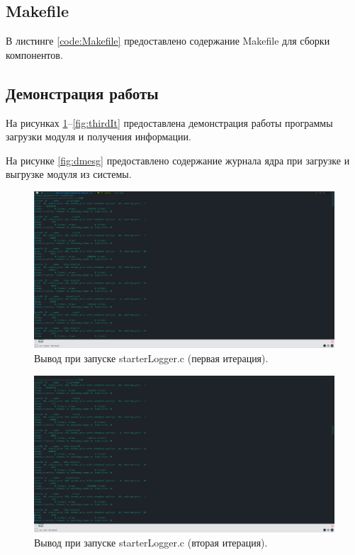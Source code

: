 \subsection{Makefile}
В листинге \ref{code:Makefile} предоставлено содержание Makefile для сборки компонентов.

\newpage
{}

\subsection{Демонстрация работы}
На рисунках \ref{fig:firstIt}--\ref{fig:thirdIt} предоставлена демонстрация работы программы загрузки модуля и получения информации.

На рисунке \ref{fig:dmesg} предоставлено содержание журнала ядра при загрузке и выгрузке модуля из системы.

\begin{figure}[H]
	\centering
	\includegraphics[scale=0.5, angle=-90]{img/firstIt.png}
	\caption{Вывод при запуске starterLogger.c (первая итерация). }
	\label{fig:firstIt}
\end{figure}

\begin{figure}[H]
	\centering
	\includegraphics[scale=0.5, angle=-90]{img/secondIt.png}
	\caption{Вывод при запуске starterLogger.c (вторая итерация). }
	\label{fig:secondIt}
\end{figure}

